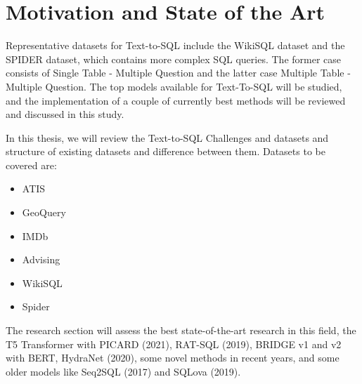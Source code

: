 

\section{Motivation and State of the Art}

Representative datasets for Text-to-SQL include the WikiSQL \cite{zhong_seq2sql_2017} dataset and the SPIDER \cite{yu_spider_2019} dataset, which contains more complex SQL queries. 
The former case consists of Single Table - Multiple Question and the latter case Multiple Table - Multiple Question. The top models available for Text-To-SQL will be studied, and the implementation of a couple of currently best methods will be reviewed and discussed in this study. 

In this thesis, we will review the Text-to-SQL Challenges and datasets and structure of existing datasets and difference between them. Datasets to be covered are:
\begin{itemize}
\item ATIS
\item GeoQuery
\item IMDb
\item Advising
\item WikiSQL
\item Spider
\end{itemize}
The research section will assess the best state-of-the-art research in this field, the T5\cite{raffel_exploring_2020} Transformer with PICARD\cite{scholak_picard_2021} (2021), RAT-SQL\cite{wang_rat-sql_2021} (2019), BRIDGE v1 and v2\cite{lin_bridging_2020} with BERT, HydraNet\cite{lyu_hybrid_2020} (2020), some novel methods in recent years, and some older models like Seq2SQL\cite{zhong_seq2sql_2017} (2017) and SQLova\cite{hwang_comprehensive_2019} (2019).

